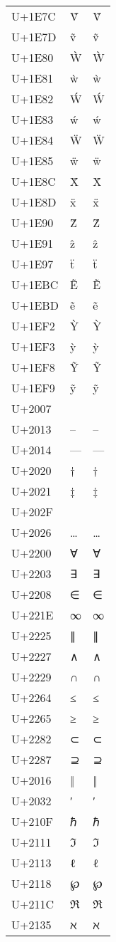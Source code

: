 \documentclass{article}
\begin{document}
\begin{longtable}{lll}
U+1E7C & Ṽ & Ṽ \\
U+1E7D & ṽ & ṽ \\
U+1E80 & Ẁ & Ẁ \\
U+1E81 & ẁ & ẁ \\
U+1E82 & Ẃ & Ẃ \\
U+1E83 & ẃ & ẃ \\
U+1E84 & Ẅ & Ẅ \\
U+1E85 & ẅ & ẅ \\
U+1E8C & Ẍ & Ẍ \\
U+1E8D & ẍ & ẍ \\
U+1E90 & Ẑ & Ẑ \\
U+1E91 & ẑ & ẑ \\
U+1E97 & ẗ & ẗ \\
U+1EBC & Ẽ & Ẽ \\
U+1EBD & ẽ & ẽ \\
U+1EF2 & Ỳ & Ỳ \\
U+1EF3 & ỳ & ỳ \\
U+1EF8 & Ỹ & Ỹ \\
U+1EF9 & ỹ & ỹ \\
U+2007 &   &   \\
U+2013 & – & – \\
U+2014 & — & — \\
U+2020 & † & † \\
U+2021 & ‡ & ‡ \\
U+202F &   &   \\
U+2026 & … & … \\
U+2200 & ∀ & ∀ \\
U+2203 & ∃ & ∃ \\
U+2208 & ∈ & ∈ \\
U+221E & ∞ & ∞ \\
U+2225 & ∥ & ∥ \\
U+2227 & ∧ & ∧ \\
U+2229 & ∩ & ∩ \\
U+2264 & ≤ & ≤ \\
U+2265 & ≥ & ≥ \\
U+2282 & ⊂ & ⊂ \\
U+2287 & ⊇ & ⊇ \\
U+2016 & ‖ & ‖ \\
U+2032 & ′ & ′ \\
U+210F & ℏ & ℏ \\
U+2111 & ℑ & ℑ \\
U+2113 & ℓ & ℓ \\
U+2118 & ℘ & ℘ \\
U+211C & ℜ & ℜ \\
U+2135 & ℵ & ℵ \\

\end{longtable}
\end{document}
